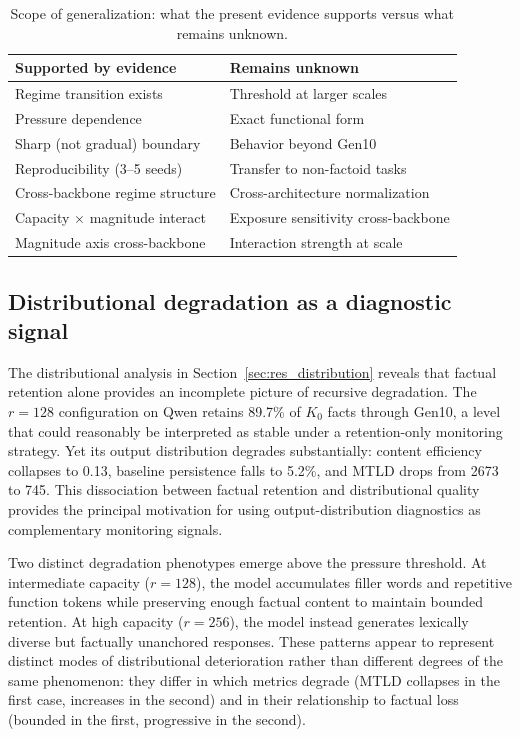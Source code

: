 \documentclass[a4paper,fleqn]{cas-dc}
\renewcommand{\arraystretch}{1.8}
\begin{document}
\begin{table}[htbp]
\caption{Scope of generalization: what the present evidence supports versus
what remains unknown.}\label{tab:generalization}
\footnotesize
\renewcommand{\arraystretch}{1.4}
\begin{tabular}{@{}p{3.6cm}p{3.6cm}@{}}
\toprule
\textbf{Supported by evidence} & \textbf{Remains unknown} \\
\midrule
Regime transition exists & Threshold at larger scales \\
\addlinespace
Pressure dependence & Exact functional form \\
\addlinespace
Sharp (not gradual) boundary & Behavior beyond Gen10 \\
\addlinespace
Reproducibility (3--5 seeds) & Transfer to non-factoid tasks \\
\addlinespace
Cross-backbone regime structure & Cross-architecture normalization \\
\addlinespace
Capacity $\times$ magnitude interact & Exposure sensitivity cross-backbone \\
\addlinespace
Magnitude axis cross-backbone & Interaction strength at scale \\
\bottomrule
\end{tabular}
\end{table}

\subsection{Distributional degradation as a diagnostic signal}\label{sec:disc_drift}

The distributional analysis in Section~\ref{sec:res_distribution} reveals that
factual retention alone provides an incomplete picture of recursive degradation.
The $r=128$ configuration on Qwen retains 89.7\% of $K_0$ facts through Gen10,
a level that could reasonably be interpreted as stable under a retention-only
monitoring strategy. Yet its output distribution degrades substantially: content
efficiency collapses to 0.13, baseline persistence falls to 5.2\%, and MTLD
drops from 2673 to 745. This dissociation between factual retention and
distributional quality provides the principal motivation for using
output-distribution diagnostics as complementary monitoring signals.

Two distinct degradation phenotypes emerge above the pressure threshold. At
intermediate capacity ($r=128$), the model accumulates filler words and
repetitive function tokens while preserving enough factual content to maintain
bounded retention. At high capacity ($r=256$), the model instead generates
lexically diverse but factually unanchored responses. These patterns appear to
represent distinct modes of distributional deterioration rather than different
degrees of the same phenomenon: they differ in which metrics degrade (MTLD
collapses in the first case, increases in the second) and in their relationship
to factual loss (bounded in the first, progressive in the second).
\end{document}
